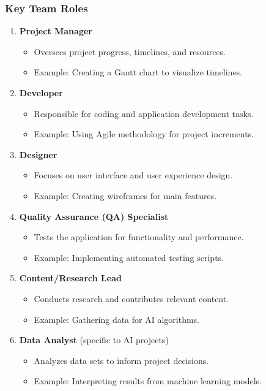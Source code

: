 \documentclass[aspectratio=169]{beamer}
\begin{document}
\begin{frame}[fragile]
    \frametitle{Key Team Roles}
    \begin{enumerate}
        \item \textbf{Project Manager}
            \begin{itemize}
                \item Oversees project progress, timelines, and resources.
                \item Example: Creating a Gantt chart to visualize timelines.
            \end{itemize}
        \item \textbf{Developer}
            \begin{itemize}
                \item Responsible for coding and application development tasks.
                \item Example: Using Agile methodology for project increments.
            \end{itemize}
        \item \textbf{Designer}
            \begin{itemize}
                \item Focuses on user interface and user experience design.
                \item Example: Creating wireframes for main features.
            \end{itemize}
        \item \textbf{Quality Assurance (QA) Specialist}
            \begin{itemize}
                \item Tests the application for functionality and performance.
                \item Example: Implementing automated testing scripts.
            \end{itemize}
        \item \textbf{Content/Research Lead}
            \begin{itemize}
                \item Conducts research and contributes relevant content.
                \item Example: Gathering data for AI algorithms.
            \end{itemize}
        \item \textbf{Data Analyst} (specific to AI projects)
            \begin{itemize}
                \item Analyzes data sets to inform project decisions.
                \item Example: Interpreting results from machine learning models.
            \end{itemize}
    \end{enumerate}
\end{frame}
\end{document}
